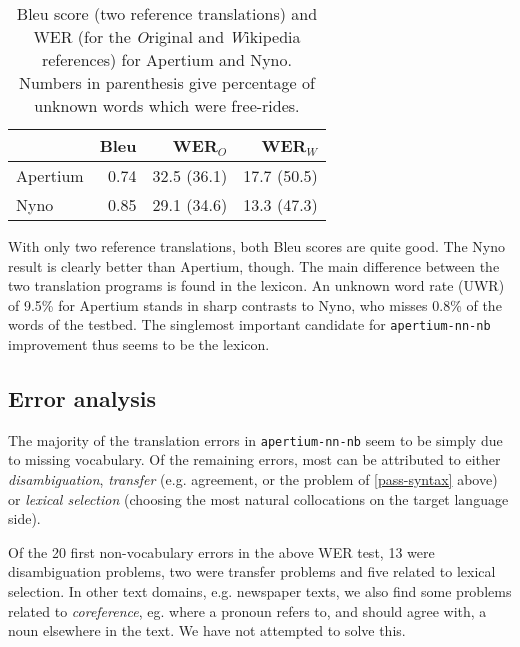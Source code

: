 \documentclass[11pt]{article}
\newcommand{\comment}[1]{\textbf{SKRIV} {\it #1}}
\renewcommand{\comment}[1]{}
\begin{document}
\begin{table}[htdp]
  \caption{{\sc Bleu} score (two reference translations) and WER (for the \emph{O}riginal and \emph{W}ikipedia references) for Apertium and Nyno. Numbers in parenthesis give percentage of unknown words which were free-rides.}
\begin{center}
\begin{tabular}{|l|r|r|r|}
  \hline
  & {\sc Bleu} &  WER$_{O}$ & WER$_{W}$ \\
  \hline					 
  Apertium    & 0.74 & 32.5 (36.1) & 17.7 (50.5) \\
  Nyno        & 0.85 & 29.1 (34.6) &13.3 (47.3) \\
  \hline
\end{tabular}
\end{center}
\label{bleu}
\end{table}%

\comment{fjerna UWR frå tabellen, sidan det står nedanfor}

With only two reference translations, both {\sc Bleu} scores are quite
good. The Nyno result is clearly better than Apertium, though. The
main difference between the two translation programs is found in the
lexicon. An unknown word rate (UWR) of 9.5\% for Apertium stands in
sharp
contrasts to Nyno, who misses 0.8\% of the words of the testbed.
The singlemost important candidate for {\tt \small  apertium-nn-nb}
improvement thus seems to be the lexicon.


\subsection{Error analysis}
The majority of the translation errors in {\tt \small  apertium-nn-nb} seem to
be simply due to missing vocabulary. Of the remaining errors, most can
be attributed to either \emph{disambiguation}, \emph{transfer} (e.g.
agreement, or the problem of \ref{pass-syntax} above) or \emph{lexical
  selection} (choosing the most natural collocations on the target
language side).

Of the 20 first non-vocabulary errors in the above WER test, 13 were
disambiguation problems, two were transfer problems and five related
to lexical selection. In other text domains, e.g. newspaper texts, we
also find some problems related to \emph{coreference}, eg. where a
pronoun refers to, and should agree with, a noun elsewhere in the
text. We have not attempted to solve this.
\end{document}
